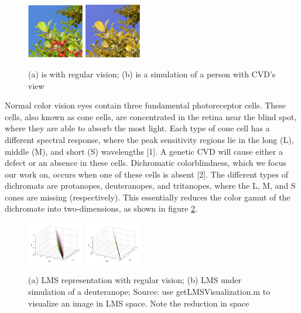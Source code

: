 \documentclass[10pt,twocolumn,letterpaper]{article}
\begin{document}
\begin{figure}[h]
  \includegraphics[width=0.22\textwidth]{grapes1.png}
  \includegraphics[width=0.22\textwidth]{grapes2.png}
  \caption{(a) is with regular vision; (b) is a simulation of a person with CVD's view}
  \label{fig:grapes}
\end{figure}

Normal color vision eyes contain three fundamental photoreceptor cells. These cells, also known as cone cells, are concentrated in the retina near the blind spot, where they are able to absorb the most light. Each type of cone cell has a different spectral response, where the peak sensitivity regions lie in the long (L), middle (M), and short (S) wavelengths [1]. A genetic CVD will cause either a defect or an absence in these cells. Dichromatic colorblindness, which we focus our work on, occurs when one of these cells is absent [2]. The different types of dichromats are protanopes, deuteranopes, and tritanopes, where the L, M, and S cones are missing (respectively). This essentially reduces the color gamut of the dichromate into two-dimensions, as shown in figure \ref{fig:gamut}.  

\begin{figure}[h]
  \includegraphics[width=0.22\textwidth]{gamut1.png}
  \includegraphics[width=0.22\textwidth]{gamut2.png}
  \caption{(a) LMS representation with regular vision; (b) LMS under simulation of a deuteranope; Source: use getLMSVisualization.m to visualize an image in LMS space. Note the reduction in space}
  \label{fig:gamut}
\end{figure}
\end{document}
